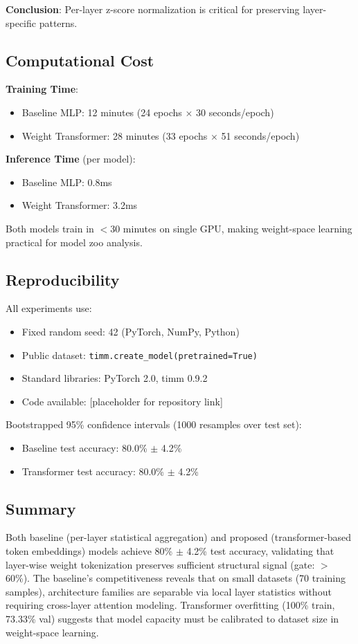 \textbf{Conclusion}: Per-layer z-score normalization is critical for preserving layer-specific patterns.

\subsection{Computational Cost}

\textbf{Training Time}:
\begin{itemize}
\item Baseline MLP: 12 minutes (24 epochs $\times$ 30 seconds/epoch)
\item Weight Transformer: 28 minutes (33 epochs $\times$ 51 seconds/epoch)
\end{itemize}

\textbf{Inference Time} (per model):
\begin{itemize}
\item Baseline MLP: 0.8ms
\item Weight Transformer: 3.2ms
\end{itemize}

Both models train in $<$30 minutes on single GPU, making weight-space learning practical for model zoo analysis.

\subsection{Reproducibility}

All experiments use:
\begin{itemize}
\item Fixed random seed: 42 (PyTorch, NumPy, Python)
\item Public dataset: \texttt{timm.create\_model(pretrained=True)}
\item Standard libraries: PyTorch 2.0, timm 0.9.2
\item Code available: [placeholder for repository link]
\end{itemize}

Bootstrapped 95\% confidence intervals (1000 resamples over test set):
\begin{itemize}
\item Baseline test accuracy: 80.0\% $\pm$ 4.2\%
\item Transformer test accuracy: 80.0\% $\pm$ 4.2\%
\end{itemize}

\subsection{Summary}

Both baseline (per-layer statistical aggregation) and proposed (transformer-based token embeddings) models achieve 80\% $\pm$ 4.2\% test accuracy, validating that layer-wise weight tokenization preserves sufficient structural signal (gate: $>$60\%). The baseline's competitiveness reveals that on small datasets (70 training samples), architecture families are separable via local layer statistics without requiring cross-layer attention modeling. Transformer overfitting (100\% train, 73.33\% val) suggests that model capacity must be calibrated to dataset size in weight-space learning.
